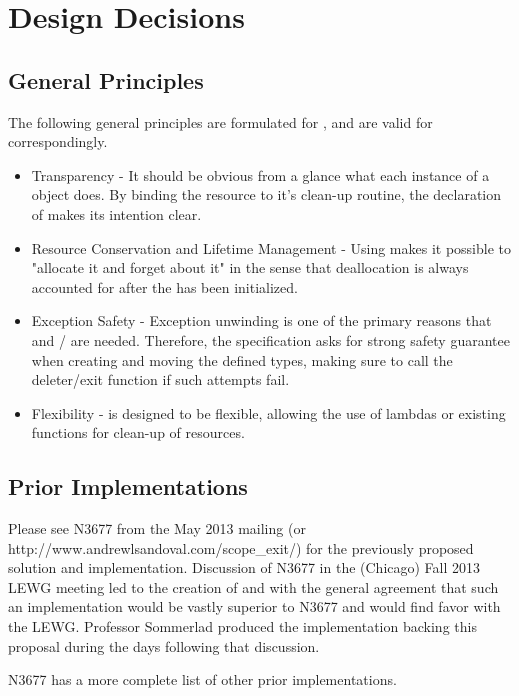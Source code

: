 \documentclass[ebook,11pt,article]{memoir}
\begin{document}
\chapter{Design Decisions}
\section{General Principles}
The following general principles are formulated for , and are valid for  correspondingly.
\begin{itemize}
\item Transparency - It should be obvious from a glance what each instance of a  object does.  By binding the resource to it's clean-up routine, the declaration of  makes its intention clear.
\item Resource Conservation and Lifetime Management - Using  makes it possible to "allocate it and forget about it" in the sense that deallocation is always accounted for after the  has been initialized.
\item Exception Safety - Exception unwinding is one of the primary reasons that  and / are needed. Therefore, the specification asks for strong safety guarantee when creating and moving the defined types, making sure to call the deleter/exit function if such attempts fail.
\item Flexibility -  is designed to be flexible, allowing the use of lambdas or existing functions for clean-up of resources. 
\end{itemize}

\section{Prior Implementations}
Please see N3677 from the May 2013 mailing (or http://www.andrewlsandoval.com/scope_exit/) for the previously proposed solution and implementation.  Discussion of N3677 in the (Chicago) Fall 2013 LEWG meeting led to the creation of  and  with the general agreement that such an implementation would be vastly superior to N3677 and would find favor with the LEWG.  Professor Sommerlad produced the implementation backing this proposal during the days following that discussion.

N3677 has a more complete list of other prior implementations.
\end{document}

